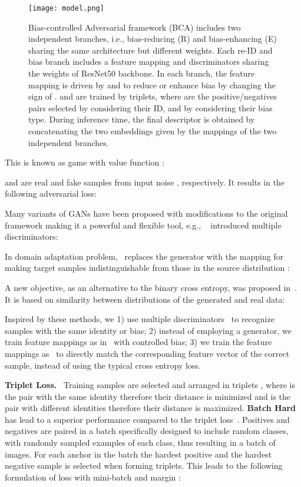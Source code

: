 \documentclass[10pt,twocolumn,letterpaper]{article}
\begin{document}
\begin{figure*}[h]
\centering
\texttt{[image: model.png]}
\caption{Bias-controlled Adversarial framework (BCA) includes two independent branches, i.e., bias-reducing (R) and bias-enhancing (E) sharing the same architecture but different weights. Each re-ID and bias branch includes a feature mapping  and discriminators  sharing the weights of ResNet50 backbone. {In each branch, the feature mapping  is driven by  and  to reduce or enhance bias by changing the sign of .  and  are trained by triplets, where  are the positive/negatives pairs selected by considering their ID, and  by considering their bias type.   
During inference time, the final descriptor is obtained by concatenating the two embeddings given by the mappings  of  the two independent branches.}}
\label{fig:Adversarial_training}
\end{figure*}
This is known as { game} with value function :


 and  are real and fake samples from input noise , respectively. It results in the following adversarial loss:

Many variants of GANs have been proposed with modifications to the original framework  making it a powerful and flexible tool, e.g., ~\cite{durugkar2016generative} introduced multiple discriminators:

In domain adaptation problem,~\cite{tzeng2017adversarial} replaces the generator with the mapping  for making target samples  indistinguishable from those in the source distribution :

 A new objective, as an  alternative to the binary cross entropy, was proposed in~\cite{salimans2016improved}. It is based on similarity between distributions of the generated and real data:






Inspired by these methods, we 1) use multiple discriminators~\cite{durugkar2016generative} to recognize samples with the same identity or bias; 2) instead of employing a generator, we train feature mappings as in~\cite{tzeng2017adversarial} with controlled bias; 3) we train the feature mappings as~\cite{salimans2016improved} to directly match the corresponding feature vector of the correct sample, instead of using the typical cross entropy loss.


\noindent\textbf{Triplet Loss.}~\cite{weinberger2009distance,ding2015deep,oh2016deep} Training samples are selected  and arranged in triplets , where
 is the pair with the same identity therefore their distance is minimized and  is the pair with different identities therefore their distance is maximized.
\newline
\textbf{Batch Hard}~\cite{hermans2017defense} has lead to a superior performance compared to the triplet loss~\cite{ding2015deep,oh2016deep}. Positives and negatives are paired in a batch specifically designed to include  random classes, with randomly sampled  examples of each class, thus resulting in a batch of  images. For each anchor in the batch the hardest positive
and the hardest negative sample is selected when forming triplets.
This leads to the following formulation of loss with mini-batch  and margin :
\end{document}
